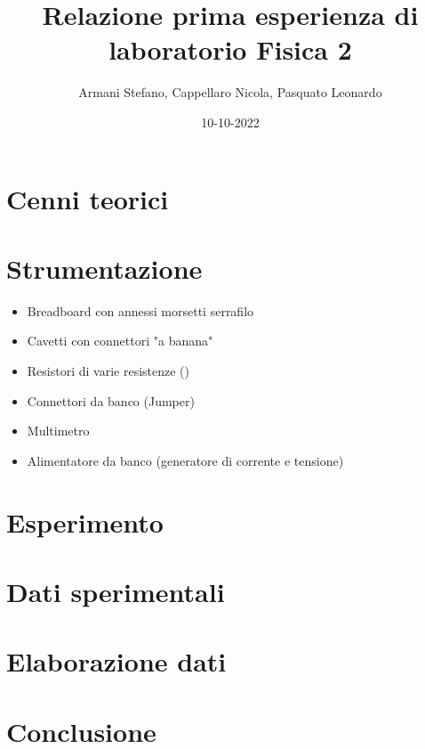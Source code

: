\documentclass{article}
\title{\huge Relazione prima esperienza di laboratorio Fisica 2}
\author{Armani Stefano, Cappellaro Nicola, Pasquato Leonardo}
\date{10-10-2022}
\begin{document}
    \maketitle

        
    \section*{Cenni teorici}
    
    \section*{Strumentazione}
    \begin{itemize}
        \item Breadboard con annessi morsetti serrafilo
        \item Cavetti con connettori "a banana"
        \item Resistori di varie resistenze ()
        \item Connettori da banco (Jumper)
        \item Multimetro
        \item Alimentatore da banco (generatore di corrente e tensione)
    \end{itemize}

    \section*{Esperimento}

    \section*{Dati sperimentali}

    \section*{Elaborazione dati}

    \section*{Conclusione}
\end{document}
